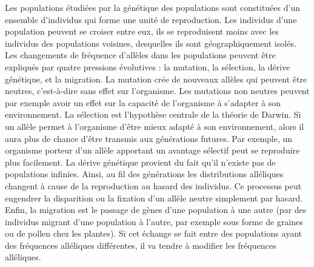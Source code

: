 \documentclass[12pt,a4paper,twoside]{ugathesis}
\begin{document}
Les populations étudiées par la génétique des populations sont constituées d'un
ensemble d'individus qui forme une unité de reproduction. Les individus d'une
population peuvent se croiser entre eux, ils se reproduisent moins avec les
individus des populations voisines, desquelles ils sont géographiquement isolés.
Les changements de fréquence d'allèles dans les populations peuvent être
expliqués par quatre pressions évolutives : la mutation, la sélection, la dérive
génétique, et la migration. La mutation crée de nouveaux allèles qui peuvent
être neutres, c'est-à-dire sans effet sur l'organisme. Les mutations non neutres
peuvent par exemple avoir un effet sur la capacité de l'organisme à s'adapter à
son environnement. La sélection est l'hypothèse centrale de la théorie de
Darwin. Si un allèle permet à l'organisme d'être mieux adapté à son
environnement, alors il aura plus de chance d'être transmis aux générations
futures. Par exemple, un organisme porteur d'un allèle apportant un avantage
sélectif peut se reproduire plus facilement. La dérive génétique provient du
fait qu'il n'existe pas de populations infinies. Ainsi, au fil des générations
les distributions alléliques changent à cause de la reproduction au hasard des
individus. Ce processus peut engendrer la disparition ou la fixation d'un allèle
neutre simplement par hasard. Enfin, la migration est le passage de gènes d'une
population à une autre (par des individus migrant d'une population à l'autre,
par exemple sous forme de graines ou de pollen chez les plantes). Si cet échange
se fait entre des populations ayant des fréquences alléliques différentes, il va
tendre à modifier les fréquences alléliques.
\end{document}
